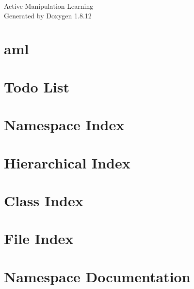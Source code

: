 \documentclass[twoside]{book}
\newcommand{\+}{\discretionary{\mbox{\scriptsize$\hookleftarrow$}}{}{}}
\newcommand{\clearemptydoublepage}{%
  \newpage{\pagestyle{empty}\cleardoublepage}%
}
\begin{document}
\hypersetup{pageanchor=false,
             bookmarksnumbered=true,
             pdfencoding=unicode
            }
\begin{titlepage}
\vspace*{7cm}
\begin{center}%
{\Large Active Manipulation Learning }\\
\vspace*{1cm}
{\large Generated by Doxygen 1.8.12}\\
\end{center}
\end{titlepage}
\clearemptydoublepage
{}
\tableofcontents
\clearemptydoublepage
{}
\hypersetup{pageanchor=true}

\chapter{aml}
\label{md__r_e_a_d_m_e}
\hypertarget{md__r_e_a_d_m_e}{}

\chapter{Todo List}
\label{todo}
\hypertarget{todo}{}

\chapter{Namespace Index}

\chapter{Hierarchical Index}

\chapter{Class Index}

\chapter{File Index}

\chapter{Namespace Documentation}

\end{document}

